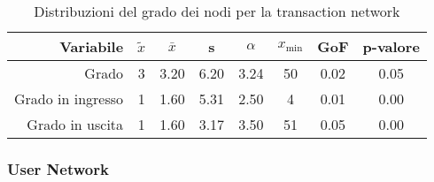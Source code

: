 \begin{table}
\centering
\caption[Grado dei nodi nella transaction network]{Distribuzioni del grado dei nodi per la transaction network\label{table:goftransactions}}
\begin{tabular}{r | c c c c c c c}
\textbf{Variabile} & \textbf{$\tilde{x}$} & \textbf{$\bar{x}$} & \textbf{s} & \textbf{$\alpha$} & \textbf{$x_\text{min}$} & \textbf{GoF} & \textbf{p-valore} \\
\hline
Grado & 3 & 3.20 & 6.20 & 3.24 & 50 & 0.02 & 0.05 \\
Grado in ingresso & 1 & 1.60 & 5.31 & 2.50 & 4 & 0.01 & 0.00 \\
Grado in uscita & 1 & 1.60 & 3.17 & 3.50 & 51 & 0.05 & 0.00 \\
\end{tabular}
\end{table}

\subsubsection{User Network}

